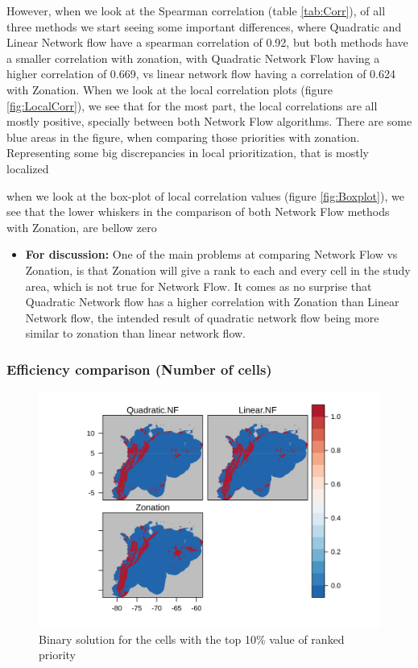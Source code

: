 \documentclass[]{article}
\providecommand{\tightlist}{%
  \setlength{\itemsep}{0pt}\setlength{\parskip}{0pt}}
\begin{document}
However, when we look at the Spearman correlation (table \ref{tab:Corr}), of all three methods we start seeing some important differences, where Quadratic and Linear Network flow have a spearman correlation of 0.92, but both methods have a smaller correlation with zonation, with Quadratic Network Flow having a higher correlation of 0.669, vs linear network flow having a correlation of 0.624 with Zonation. When we look at the local correlation plots (figure \ref{fig:LocalCorr}), we see that for the most part, the local correlations are all mostly positive, specially between both Network Flow algorithms. There are some blue areas in the figure, when comparing those priorities with zonation. Representing some big discrepancies in local prioritization, that is mostly localized

when we look at the box-plot of local correlation values (figure \ref{fig:Boxplot}), we see that the lower whiskers in the comparison of both Network Flow methods with Zonation, are bellow zero

\begin{itemize}
\tightlist
\item
  \textbf{For discussion:} One of the main problems at comparing Network Flow vs Zonation, is that Zonation will give a rank to each and every cell in the study area, which is not true for Network Flow. It comes as no surprise that Quadratic Network flow has a higher correlation with Zonation than Linear Network flow, the intended result of quadratic network flow being more similar to zonation than linear network flow.
\end{itemize}

\hypertarget{efficiency-comparison-number-of-cells}{%
\subsubsection{Efficiency comparison (Number of cells)}\label{efficiency-comparison-number-of-cells}}

\begin{figure}
\centering
\includegraphics{NFPaper_files/figure-latex/Binary-1.png}
\caption{\label{fig:Binary}Binary solution for the cells with the top 10\% value of ranked priority}
\end{figure}
\end{document}
